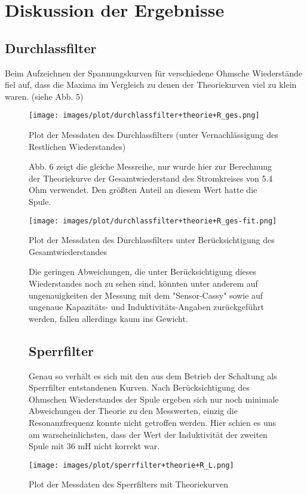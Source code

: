 \section{Diskussion der Ergebnisse}
\subsection{Durchlassfilter}
Beim Aufzeichnen der Spannungskurven für verschiedene Ohmsche Wiederstände fiel auf, dass die Maxima im Vergleich zu denen der Theoriekurven viel zu klein waren. (siehe Abb. 5)
\begin{figure}
        \texttt{[image: images/plot/durchlassfilter+theorie+R\_ges.png]}
\caption{Plot der Messdaten des Durchlassfilters (unter Vernachlässigung des Restlichen Wiederstandes)}
\label{plot:durchlass+R_ges-fit}
Abb. 6 zeigt die gleiche Messreihe, nur wurde hier zur Berechnung der Theoriekurve der Gesamtwiederstand des Stromkreises von 5.4 Ohm verwendet. Den größten Anteil an diesem Wert hatte die Spule.

\texttt{[image: images/plot/durchlassfilter+theorie+R\_ges-fit.png]}
\caption{Plot der Messdaten des Durchlassfilters unter Berücksichtigung des Gesamtwiederstandes}
\label{plot:durchlass+R_ges-fit}
Die geringen Abweichungen, die unter Berücksichtigung dieses Wiederstandes noch zu sehen sind, könnten unter anderem auf ungenauigkeiten der Messung mit dem "Sensor-Cassy" sowie auf ungenaue Kapazitäts- und Induktivitäts-Angaben zurückgeführt werden, fallen allerdings kaum ins Gewicht.
\subsection{Sperrfilter}
Genau so verhält es sich mit den aus dem Betrieb der Schaltung als Sperrfilter entstandenen Kurven. Nach Berücksichtigung des Ohmschen Wiederstandes der Spule ergeben sich nur noch minimale Abweichungen der Theorie zu den Messwerten, einzig die Resonanzfrequenz konnte nicht getroffen werden. Hier schien es uns am warscheinlichsten, dass der Wert der Induktivität der zweiten Spule mit 36 mH nicht korrekt war.

        \texttt{[image: images/plot/sperrfilter+theorie+R\_L.png]}
\caption{Plot der Messdaten des Sperrfilters mit Theoriekurven}
\label{plot:sperr}
\end{figure}



